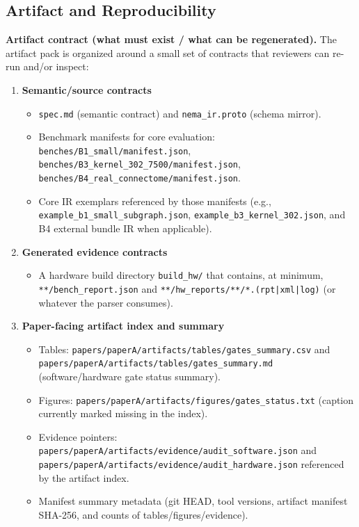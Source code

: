 \subsection{Artifact and Reproducibility}

\textbf{Artifact contract (what must exist / what can be regenerated).}
The artifact pack is organized around a small set of contracts that reviewers can re-run and/or inspect:
\begin{enumerate}
\item \textbf{Semantic/source contracts}
\begin{itemize}
\item \texttt{spec.md} (semantic contract) and \texttt{nema\_ir.proto} (schema mirror).
\item Benchmark manifests for core evaluation: \texttt{benches/B1\_small/manifest.json}, \texttt{benches/B3\_kernel\_302\_7500/manifest.json}, \texttt{benches/B4\_real\_connectome/manifest.json}.
\item Core IR exemplars referenced by those manifests (e.g., \texttt{example\_b1\_small\_subgraph.json}, \texttt{example\_b3\_kernel\_302.json}, and B4 external bundle IR when applicable).
\end{itemize}
\item \textbf{Generated evidence contracts}
\begin{itemize}
\item A hardware build directory \texttt{build\_hw/} that contains, at minimum, \texttt{**/bench\_report.json} and \texttt{**/hw\_reports/**/*.(rpt|xml|log)} (or whatever the parser consumes).
\end{itemize}
\item \textbf{Paper-facing artifact index and summary}
\begin{itemize}
\item Tables: \texttt{papers/paperA/artifacts/tables/gates\_summary.csv} and \texttt{papers/paperA/artifacts/tables/gates\_summary.md} (software/hardware gate status summary).
\item Figures: \texttt{papers/paperA/artifacts/figures/gates\_status.txt} (caption currently marked missing in the index).
\item Evidence pointers: \texttt{papers/paperA/artifacts/evidence/audit\_software.json} and \texttt{papers/paperA/artifacts/evidence/audit\_hardware.json} referenced by the artifact index.
\item Manifest summary metadata (git HEAD, tool versions, artifact manifest SHA-256, and counts of tables/figures/evidence).
\end{itemize}
\end{enumerate}

